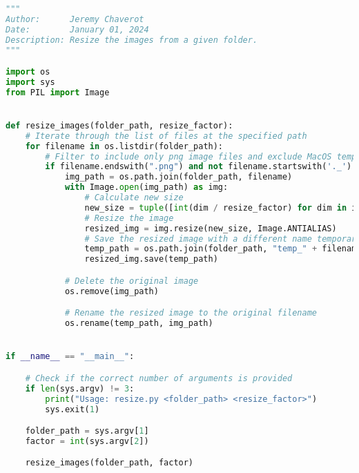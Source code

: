 \begin{lstlisting}[language=Python, label=lst:5, caption=Python script \texttt{resize.py} designed to alter an image's size with respect to a specified resize factor.]
"""
Author:      Jeremy Chaverot
Date:        January 01, 2024
Description: Resize the images from a given folder.
"""

import os
import sys
from PIL import Image


def resize_images(folder_path, resize_factor):
	# Iterate through the list of files at the specified path
    for filename in os.listdir(folder_path):
    	# Filter to include only png image files and exclude MacOS temporary files
        if filename.endswith(".png") and not filename.startswith('._'):
            img_path = os.path.join(folder_path, filename)
            with Image.open(img_path) as img:
                # Calculate new size
                new_size = tuple([int(dim / resize_factor) for dim in img.size])
                # Resize the image
                resized_img = img.resize(new_size, Image.ANTIALIAS)
                # Save the resized image with a different name temporarily
                temp_path = os.path.join(folder_path, "temp_" + filename)
                resized_img.save(temp_path)

            # Delete the original image
            os.remove(img_path)

            # Rename the resized image to the original filename
            os.rename(temp_path, img_path)


if __name__ == "__main__":

	# Check if the correct number of arguments is provided
    if len(sys.argv) != 3:
        print("Usage: resize.py <folder_path> <resize_factor>")
        sys.exit(1)

    folder_path = sys.argv[1]
    factor = int(sys.argv[2])

    resize_images(folder_path, factor)
\end{lstlisting}




\cleardoublepage{}
